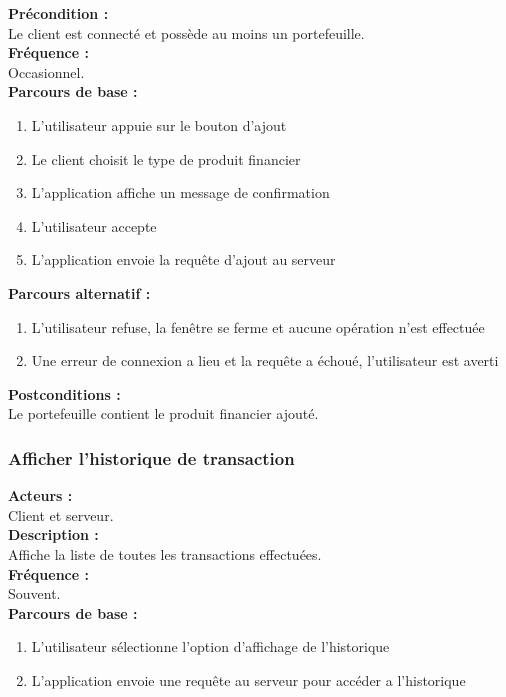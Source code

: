 \documentclass[../rapport.tex]{subfiles}
\begin{document}
\textbf{Précondition :} \\
Le client est connecté et possède au moins un portefeuille. \\

\textbf{Fréquence :} \\
Occasionnel. \\

\textbf{Parcours de base :} \\
\begin{enumerate}
    \item L'utilisateur appuie sur le bouton d'ajout
    \item Le client choisit le type de produit financier
    \item L'application affiche un message de confirmation
    \item L'utilisateur accepte
    \item L'application envoie la requête d'ajout au serveur
\end{enumerate}
\bigskip

\textbf{Parcours alternatif :}
\begin{enumerate}
    \item L'utilisateur refuse, la fenêtre se ferme et aucune opération n'est effectuée
    \item Une erreur de connexion a lieu et la requête a échoué, l'utilisateur est averti
\end{enumerate}

\textbf{Postconditions :} \\
Le portefeuille contient le produit financier ajouté. \\



\subsubsection{Afficher l'historique de transaction}

\textbf{Acteurs :} \\
Client et serveur. \\

\textbf{Description :} \\
Affiche la liste de toutes les transactions effectuées. \\

\textbf{Fréquence :} \\
Souvent. \\

\textbf{Parcours de base :} \\
\begin{enumerate}
    \item L’utilisateur sélectionne l’option d’affichage de l’historique
    \item L’application envoie une requête au serveur pour accéder a l’historique
\end{enumerate}
\bigskip
\end{document}
